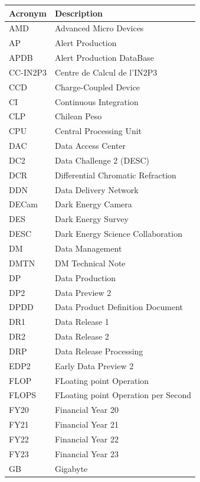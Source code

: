 \addtocounter{table}{-1}
\begin{longtable}{p{}p{}}\hline
\textbf{Acronym} & \textbf{Description}  \\\hline

AMD & Advanced Micro Devices \\\hline
AP & Alert Production \\\hline
APDB & Alert Production DataBase \\\hline
CC-IN2P3 & Centre de Calcul de l'IN2P3 \\\hline
CCD & Charge-Coupled Device \\\hline
CI & Continuous Integration \\\hline
CLP & Chilean Peso \\\hline
CPU & Central Processing Unit \\\hline
DAC & Data Access Center \\\hline
DC2 & Data Challenge 2 (DESC) \\\hline
DCR & Differential Chromatic Refraction \\\hline
DDN & Data Delivery Network \\\hline
DECam & Dark Energy Camera \\\hline
DES & Dark Energy Survey \\\hline
DESC & Dark Energy Science Collaboration \\\hline
DM & Data Management \\\hline
DMTN & DM Technical Note \\\hline
DP & Data Production \\\hline
DP2 & Data Preview 2 \\\hline
DPDD & Data Product Definition Document \\\hline
DR1 & Data Release 1 \\\hline
DR2 & Data Release 2 \\\hline
DRP & Data Release Processing \\\hline
EDP2 & Early Data Preview 2 \\\hline
FLOP & FLoating point Operation \\\hline
FLOPS & FLoating point Operation per Second \\\hline
FY20 & Financial Year 20 \\\hline
FY21 & Financial Year 21 \\\hline
FY22 & Financial Year 22 \\\hline
FY23 & Financial Year 23 \\\hline
GB & Gigabyte \\\hline

\end{longtable}
